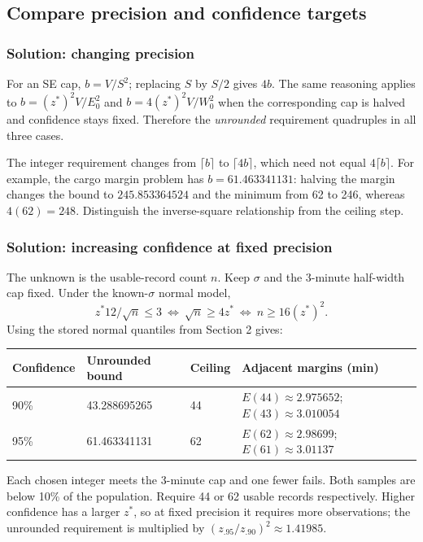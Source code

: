 \subsection{Compare precision and confidence targets}\label{prob:advanced-scale}
\subsubsection*{Solution: changing precision}\label{sol:advanced-scale}
For an SE cap, $b=V/S^2$; replacing $S$ by $S/2$ gives $4b$. The same reasoning applies to $b=(z^*)^2V/E_0^2$ and $b=4(z^*)^2V/W_0^2$ when the corresponding cap is halved and confidence stays fixed. Therefore the \emph{unrounded} requirement quadruples in all three cases.

The integer requirement changes from $\lceil b\rceil$ to $\lceil4b\rceil$, which need not equal $4\lceil b\rceil$. For example, the cargo margin problem has $b=61.463341131$: halving the margin changes the bound to $245.853364524$ and the minimum from 62 to 246, whereas $4(62)=248$. Distinguish the inverse-square relationship from the ceiling step.
\subsubsection*{Solution: increasing confidence at fixed precision}\label{sol:advanced-confidence}
The unknown is the usable-record count $n$. Keep $\sigma$ and the 3-minute half-width cap fixed. Under the known-$\sigma$ normal model,
\[
z^*12/\sqrt n\le3\ \Longleftrightarrow\ \sqrt n\ge4z^*
\ \Longleftrightarrow\ n\ge16(z^*)^2.
\]
Using the stored normal quantiles from Section 2 gives:
\begin{center}\begin{tabular}{@{}llll@{}}\toprule
Confidence & Unrounded bound & Ceiling & Adjacent margins (min)\\\midrule
90\% & 43.288695265 & 44 & $E(44)\approx2.975652$; $E(43)\approx3.010054$\\
95\% & 61.463341131 & 62 & $E(62)\approx2.98699$; $E(61)\approx3.01137$\\\bottomrule
\end{tabular}\end{center}
Each chosen integer meets the 3-minute cap and one fewer fails. Both samples are below 10\% of the population. Require 44 or 62 usable records respectively. Higher confidence has a larger $z^*$, so at fixed precision it requires more observations; the unrounded requirement is multiplied by $(z_{.95}/z_{.90})^2\approx1.41985$.
\clearpage

